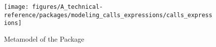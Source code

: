 %
%


\begin{figure}[htbp]
  \centering
  \texttt{[image: figures/A\_technical-reference/packages/modeling\_calls\_expressions/calls\_expressions]}
  \caption{Metamodel of the  Package}
  \label{fig:MM:activities}
\end{figure}
